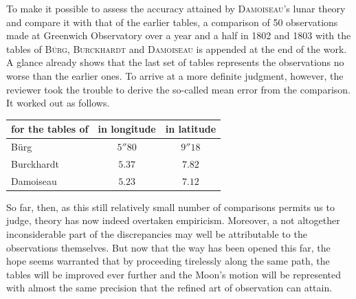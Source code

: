 To make it possible to assess the accuracy attained by \textsc{Damoiseau}'s lunar theory and compare it with that of the earlier tables, a comparison of 50 observations made at Greenwich Observatory over a year and a half in 1802 and 1803 with the tables of \textsc{Bürg}, \textsc{Burckhardt} and \textsc{Damoiseau} is appended at the end of the work. A glance already shows that the last set of tables represents the observations no worse than the earlier ones. To arrive at a more definite judgment, however, the reviewer took the trouble to derive the so-called mean error from the comparison. It worked out as follows.
\begin{center}
\begin{tabular}{l|c|c}
for the tables of & in longitude & in latitude \\
\hline
Bürg & $5''80$ & $9''18$ \\
Burckhardt & $5.37$ & $7.82$ \\
Damoiseau & $5.23$ & $7.12$ \\
\end{tabular}
\end{center}
\noindent So far, then, as this still relatively small number of comparisons permits us to judge, theory has now indeed overtaken empiricism.
Moreover, a not altogether  inconsiderable part of the discrepancies may well be attributable to the observations themselves.
But now that the way has been opened this far, the hope seems warranted that by proceeding tirelessly along the same path, the tables will be improved ever further and the Moon's motion will be represented with almost the same precision that the refined art of observation can attain.
